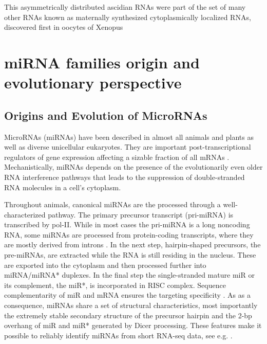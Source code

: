 \documentclass[graybox]{svmult}
\begin{document}
This asymmetrically distributed ascidian RNAs were part of the set of many 
other RNAs known as maternally synthesized cytoplasmically localized RNAs, 
discovered first in oocytes of Xenopus \cite{Bashirullah1998}

\section{miRNA families origin and evolutionary perspective}
\label{sec:2}

\subsection{Origins and Evolution of MicroRNAs}

MicroRNAs (miRNAs) have been described in almost all animals and plants as
well as diverse unicellular eukaryotes. They are important
post-transcriptional regulators of gene expression affecting a sizable
fraction of all mRNAs \cite{Ameres:13}. Mechanistically, miRNAs depends on
the presence of the evolutionarily even older RNA interference pathways
\cite{Cerutti:06, Shabalina:08} that leads to the suppression of
double-stranded RNA molecules in a cell's cytoplasm. 

Throughout animals, canonical miRNAs are the processed through a
well-characterized pathway. The primary precursor transcript (pri-miRNA) is
transcribed by pol-II. While in most cases the pri-miRNA is a long
noncoding RNA, some miRNAs are processed from protein-coding transcripts,
where they are mostly derived from introns \cite{Lin:06}. In the next step,
hairpin-shaped precursors, the pre-miRNAs, are extracted while the RNA is
still residing in the nucleus. These are exported into the cytoplasm
\cite{Lund:04} and then processed further into miRNA/miRNA* duplexes.  In
the final step the single-stranded mature miR or its complement, the miR*,
is incorporated in RISC complex. Sequence complementarity of miR and mRNA
ensures the targeting specificity \cite{Bartel:13}. As as a consequence,
miRNAs share a set of structural characteristics, most importantly the
extremely stable secondary structure of the precursor hairpin and the 2-bp
overhang of miR and miR* generated by Dicer processing. These features make
it possible to reliably identify miRNAs from short RNA-seq data, see e.g.
\cite{Langenberger:10a, Friedlaender:12, Langenberger:13a}.
\end{document}
